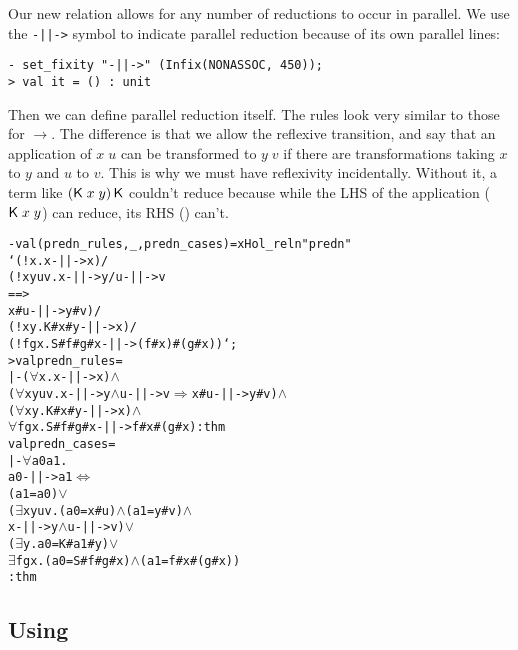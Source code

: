 Our new relation allows for any number of reductions to occur in
parallel.  We use the \texttt{-||->} symbol to indicate parallel
reduction because of its own parallel lines:
\begin{session}
\begin{verbatim}
- set_fixity "-||->" (Infix(NONASSOC, 450));
> val it = () : unit
\end{verbatim}
\end{session}
    Then we can define parallel reduction itself.  The rules look very
    similar to those for $\rightarrow$.  The difference is that we
    allow the reflexive transition, and say that an application of
    $x\;u$ can be transformed to $y\;v$ if there are transformations
    taking $x$ to $y$ and $u$ to $v$.  This is why we must have
    reflexivity incidentally.  Without it, a term like
    $({\sf K}\;x\;y)\,{\sf K}$ couldn't reduce because while the LHS of the
    application (${\sf K}\;x\;y$) can reduce, its RHS (\KC) can't.
\begin{session}
\begin{alltt}
- val (predn_rules, _, predn_cases) = xHol_reln "predn"
      `(!x. x -||-> x) /\bs
       (!x y u v. x -||-> y /\bs u -||-> v
                         ==>
                  x # u -||-> y # v) /\bs
       (!x y. K # x # y -||-> x) /\bs
       (!f g x. S # f # g # x -||-> (f # x) # (g # x))`;
> val predn_rules =
    |- (\(\forall\)x. x -||-> x) \(\land\)
       (\(\forall\)x y u v. x -||-> y \(\land\) u -||-> v \(\Rightarrow\) x # u -||-> y # v) \(\land\)
       (\(\forall\)x y. K # x # y -||-> x) \(\land\)
       \(\forall\)f g x. S # f # g # x -||-> f # x # (g # x) : thm
  val predn_cases =
    |- \(\forall\)a0 a1.
         a0 -||-> a1 \(\Leftrightarrow\)
         (a1 = a0) \(\lor\)
         (\(\exists\)x y u v. (a0 = x # u) \(\land\) (a1 = y # v) \(\land\)
                    x -||-> y \(\land\) u -||-> v) \(\lor\)
         (\(\exists\)y. a0 = K # a1 # y) \(\lor\)
         \(\exists\)f g x. (a0 = S # f # g # x) \(\land\) (a1 = f # x # (g # x))
    : thm
\end{alltt}
\end{session}

\subsection{Using }
\label{sec:Using-RTC}

